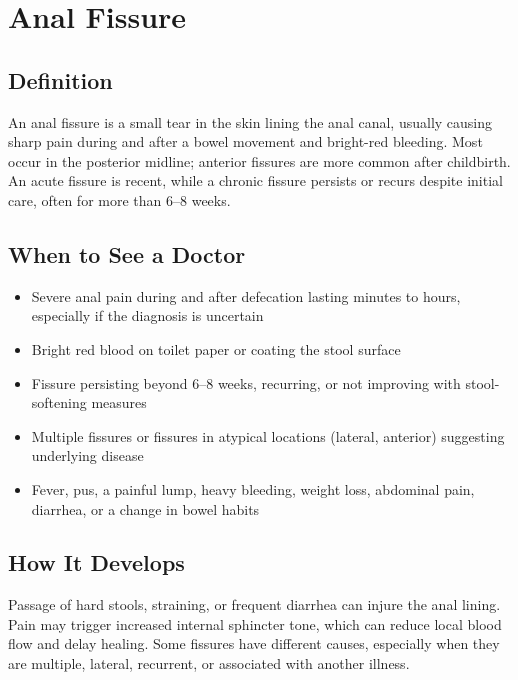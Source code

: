 \chapter{Anal Fissure}

\section*{Definition}
An anal fissure is a small tear in the skin lining the anal canal, usually causing sharp pain during and after a bowel movement and bright-red bleeding. Most occur in the posterior midline; anterior fissures are more common after childbirth. An acute fissure is recent, while a chronic fissure persists or recurs despite initial care, often for more than 6--8 weeks.

\section*{When to See a Doctor}

\begin{itemize}
 \item Severe anal pain during and after defecation lasting minutes to hours, especially if the diagnosis is uncertain
 \item Bright red blood on toilet paper or coating the stool surface
 \item Fissure persisting beyond 6--8 weeks, recurring, or not improving with stool-softening measures
 \item Multiple fissures or fissures in atypical locations (lateral, anterior) suggesting underlying disease
 \item Fever, pus, a painful lump, heavy bleeding, weight loss, abdominal pain, diarrhea, or a change in bowel habits
\end{itemize}

\section*{How It Develops}
Passage of hard stools, straining, or frequent diarrhea can injure the anal lining. Pain may trigger increased internal sphincter tone, which can reduce local blood flow and delay healing. Some fissures have different causes, especially when they are multiple, lateral, recurrent, or associated with another illness.

